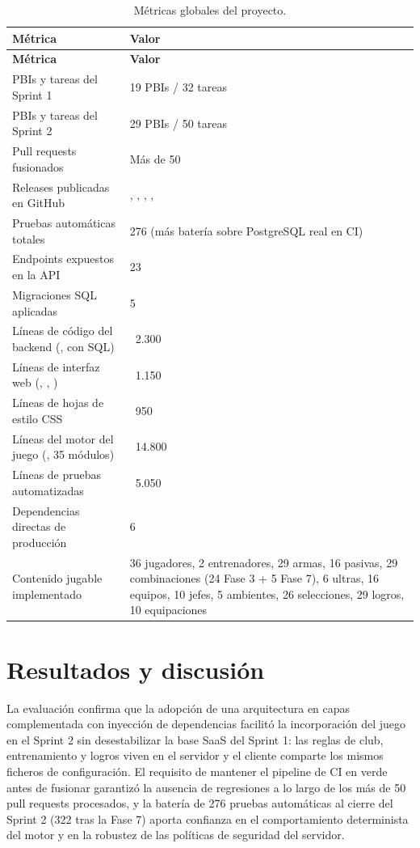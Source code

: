 \begin{longtable}{@{}L{6.0cm} L{8.0cm}@{}}
\caption{Métricas globales del proyecto.}\label{tab:metricas}\\
\toprule
\textbf{Métrica} & \textbf{Valor} \\ \midrule \endfirsthead
\toprule
\textbf{Métrica} & \textbf{Valor} \\ \midrule \endhead
PBIs y tareas del Sprint 1 & 19 PBIs / 32 tareas \\
PBIs y tareas del Sprint 2 & 29 PBIs / 50 tareas \\
Pull requests fusionados & Más de 50 \\
Releases publicadas en GitHub & , , , ,  \\
Pruebas automáticas totales & 276 (más batería sobre PostgreSQL real en CI) \\
Endpoints expuestos en la API & 23 \\
Migraciones SQL aplicadas & 5 \\
Líneas de código del backend (, con SQL) & ~2.300 \\
Líneas de interfaz web (, , ) & ~1.150 \\
Líneas de hojas de estilo CSS & ~950 \\
Líneas del motor del juego (, 35 módulos) & ~14.800 \\
Líneas de pruebas automatizadas & ~5.050 \\
Dependencias directas de producción & 6 \\
Contenido jugable implementado & 36 jugadores, 2 entrenadores, 29 armas, 16 pasivas, 29 combinaciones (24 Fase 3 + 5 Fase 7), 6 ultras, 16 equipos, 10 jefes, 5 ambientes, 26 selecciones, 29 logros, 10 equipaciones \\*
\bottomrule
\end{longtable}

\section{Resultados y discusión}

La evaluación confirma que la adopción de una arquitectura en capas complementada con inyección de dependencias facilitó la incorporación del juego en el Sprint 2 sin desestabilizar la base SaaS del Sprint 1: las reglas de club, entrenamiento y logros viven en el servidor y el cliente comparte los mismos ficheros de configuración. El requisito de mantener el pipeline de CI en verde antes de fusionar garantizó la ausencia de regresiones a lo largo de los más de 50 pull requests procesados, y la batería de 276 pruebas automáticas al cierre del Sprint 2 (322 tras la Fase 7) aporta confianza en el comportamiento determinista del motor y en la robustez de las políticas de seguridad del servidor.

